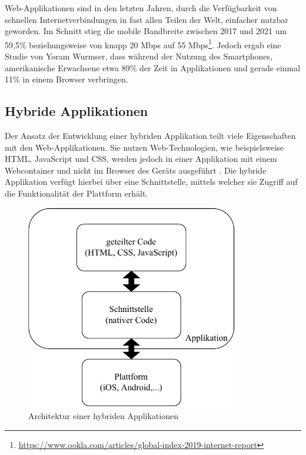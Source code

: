 Web-Applikationen sind in den letzten Jahren, durch die Verfügbarkeit von schnellen Internetverbindungen in fast allen Teilen der Welt, einfacher nutzbar geworden.
Im Schnitt stieg die mobile Bandbreite zwischen 2017 und 2021 um 59,5\% beziehungsweise von knapp 20 Mbps auf 55 Mbps\footnote{\url{https://www.ookla.com/articles/global-index-2019-internet-report}}.
Jedoch ergab eine Studie\cite{report_webusage} von Yoram Wurmser, dass während der Nutzung des Smartphones, amerikanische Erwachsene etwa 89\% der Zeit in Applikationen und gerade einmal 11\% in einem Browser verbringen.

\subsection{Hybride Applikationen}
\label{cha:3_hybrid}
Der Ansatz der Entwicklung einer hybriden Applikation teilt viele Eigenschaften mit den Web-Applikationen.
Sie nutzen Web-Technologien, wie beispielsweise HTML, JavaScript und CSS, werden jedoch in einer Applikation mit einem Webcontainer und nicht im Browser des Geräts ausgeführt \cite{IEEE_development_classes}.
Die hybride Applikation verfügt hierbei über eine Schnittstelle, mittels welcher sie Zugriff auf die Funktionalität der Plattform erhält.

\begin{figure}[ht]
  \centering
  \includegraphics[height=9cm,keepaspectratio]{images/hybrid_architecture.drawio.pdf} 
  \caption{Architektur einer hybriden Applikationen}
  \label{fig:hybrid_architecture}
\end{figure}

